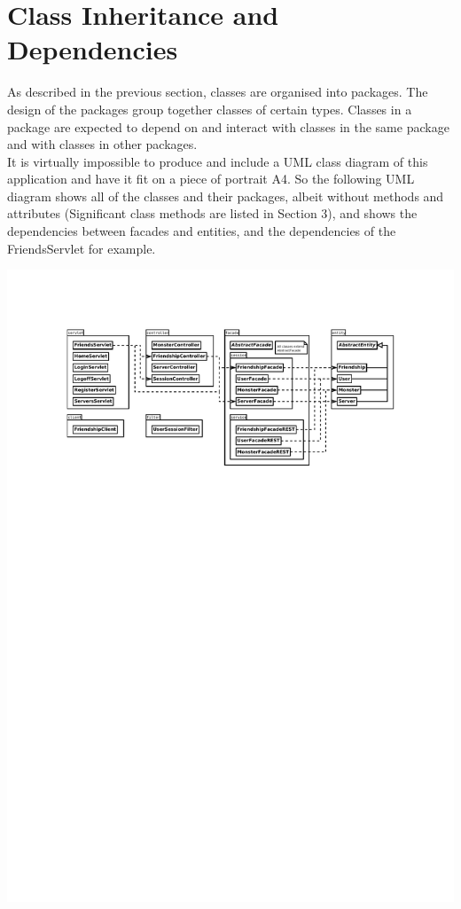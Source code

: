 \section{Class Inheritance and Dependencies}
As described in the previous section, classes are organised into packages. The design of the packages group together classes of certain types. Classes in a package are expected to depend on and interact with classes in the same package and with classes in other packages.\\
It is virtually impossible to produce and include a UML class diagram of this application and have it fit on a piece of portrait A4. So the following UML diagram shows all of the classes and their packages, albeit without methods and attributes (Significant class methods are listed in Section 3), and shows the dependencies between facades and entities, and the dependencies of the FriendsServlet for example.

\includegraphics[scale=1.0]{img/dependencydiagram.pdf}

